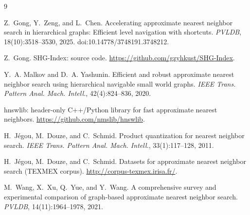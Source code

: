 \documentclass[11pt]{article}
\begin{document}
\clearpage
{}
{}
\begin{thebibliography}{9}

Z.~Gong, Y.~Zeng, and L.~Chen.
\newblock Accelerating approximate nearest neighbor search in hierarchical graphs:
  Efficient level navigation with shortcuts.
\newblock \emph{PVLDB}, 18(10):3518--3530, 2025.
\newblock doi:10.14778/3748191.3748212.

Z.~Gong.
\newblock SHG-Index: source code.
\newblock \url{https://github.com/gzyhkust/SHG-Index}.

Y.~A. Malkov and D.~A. Yashunin.
\newblock Efficient and robust approximate nearest neighbor search using
  hierarchical navigable small world graphs.
\newblock \emph{IEEE Trans. Pattern Anal. Mach. Intell.}, 42(4):824--836, 2020.

hnswlib: header-only C++/Python library for fast approximate nearest neighbors.
\newblock \url{https://github.com/nmslib/hnswlib}.

H.~J\'egou, M.~Douze, and C.~Schmid.
\newblock Product quantization for nearest neighbor search.
\newblock \emph{IEEE Trans. Pattern Anal. Mach. Intell.}, 33(1):117--128, 2011.

H.~J\'egou, M.~Douze, and C.~Schmid.
\newblock Datasets for approximate nearest neighbor search (TEXMEX corpus).
\newblock \url{http://corpus-texmex.irisa.fr/}.

M.~Wang, X.~Xu, Q.~Yue, and Y.~Wang.
\newblock A comprehensive survey and experimental comparison of graph-based
  approximate nearest neighbor search.
\newblock \emph{PVLDB}, 14(11):1964--1978, 2021.

\end{thebibliography}
\end{document}
